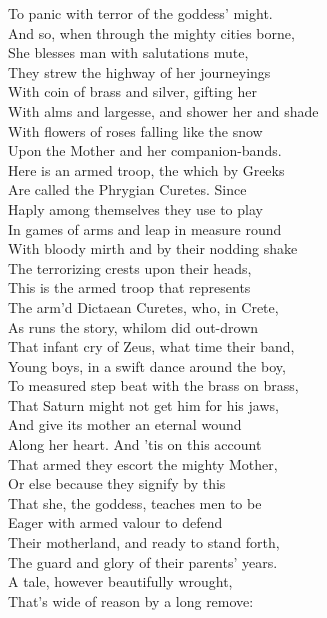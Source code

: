 To panic with terror of the goddess' might.\\
And so, when through the mighty cities borne,\\
She blesses man with salutations mute,\\
They strew the highway of her journeyings\\
With coin of brass and silver, gifting her\\
With alms and largesse, and shower her and shade\\
With flowers of roses falling like the snow\\
Upon the Mother and her companion-bands.\\
Here is an armed troop, the which by Greeks\\
Are called the Phrygian Curetes. Since\\
Haply among themselves they use to play\\
In games of arms and leap in measure round\\
With bloody mirth and by their nodding shake\\
The terrorizing crests upon their heads,\\
This is the armed troop that represents\\
The arm'd Dictaean Curetes, who, in Crete,\\
As runs the story, whilom did out-drown\\
That infant cry of Zeus, what time their band,\\
Young boys, in a swift dance around the boy,\\
To measured step beat with the brass on brass,\\
That Saturn might not get him for his jaws,\\
And give its mother an eternal wound\\
Along her heart. And 'tis on this account\\
That armed they escort the mighty Mother,\\
Or else because they signify by this\\
That she, the goddess, teaches men to be\\
Eager with armed valour to defend\\
Their motherland, and ready to stand forth,\\
The guard and glory of their parents' years.\\
A tale, however beautifully wrought,\\
That's wide of reason by a long remove:\\
